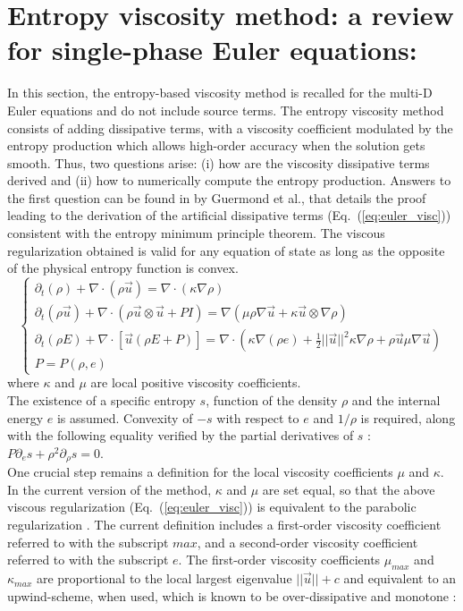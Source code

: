 \documentclass{article}
\newcommand{\eqt}[1]{Eq.~(\ref{#1})}                     %
\begin{document}
\section{Entropy viscosity method: a review for single-phase Euler equations:}
\label{sec:section1}
In this section, the entropy-based viscosity method \cite{valentin, jlg1, jlg2} is recalled for the multi-D Euler equations \cite{Toro} and do not include source terms. The entropy viscosity method consists of adding dissipative terms, with a viscosity coefficient modulated by the entropy production which allows high-order accuracy when the solution gets smooth. Thus, two questions arise: (i) how are the viscosity dissipative terms derived and (ii) how to numerically compute the entropy production. Answers to the first question can be found in \cite{jlg} by Guermond et al., that details the proof leading to the derivation of the artificial dissipative terms (\eqt{eq:euler_visc}) consistent with the entropy minimum principle theorem. The viscous regularization obtained is valid for any equation of state as long as the opposite of the physical entropy function is convex.
\begin{equation}
\label{eq:euler_visc}
\left\{ 
\begin{array}{lll}
\partial_t \left( \rho \right) + \nabla \cdot \left( \rho \vec{u} \right) = \nabla \cdot \left( \kappa \nabla \rho \right) \\
\partial_t \left( \rho \vec{u} \right) + \nabla \cdot \left( \rho \vec{u} \otimes \vec{u} + P I \right) = \nabla \left( \mu \rho \nabla \vec{u}  + \kappa \vec{u} \otimes \nabla \rho \right)  \\
\partial_t \left( \rho E \right) + \nabla \cdot \left[ \vec{u} \left( \rho E + P \right) \right] = \nabla \cdot \left( \kappa \nabla \left( \rho e \right) + \frac{1}{2}|| \vec{u} ||^2 \kappa \nabla \rho +  \rho \vec{u} \mu \nabla \vec{u}  \right) \\
P = P\left( \rho, e \right)
\end{array}
\right.
\end{equation}
where $\kappa$ and $\mu$ are local positive viscosity coefficients. \\
The existence of a specific entropy $s$, function of the density $\rho$ and the internal energy $e$ is assumed. Convexity of $-s$ with respect to $e$ and $1/\rho$ is required, along with the following equality verified by the partial derivatives of $s$ : $P \partial_e s + \rho^2 \partial_{\rho} s = 0$.\\
One crucial step remains a definition for the local viscosity coefficients $\mu$ and $\kappa$. In the current version of the method, $\kappa$ and $\mu$ are set equal, so that the above viscous regularization (\eqt{eq:euler_visc}) is equivalent to the parabolic regularization \cite{Parabolic}. The current definition includes a first-order viscosity coefficient referred to with the subscript $max$, and a second-order viscosity coefficient referred to with the subscript $e$. The first-order viscosity coefficients $\mu_{max}$ and $\kappa_{max}$ are proportional to the local largest eigenvalue $|| \vec{u} || + c $ and equivalent to an upwind-scheme, when used, which is known to be over-dissipative and monotone \cite{Toro}: 
\end{document}
